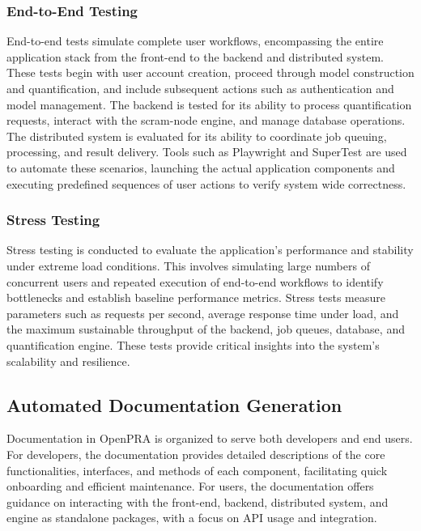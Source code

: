 \subsubsection{End-to-End Testing}

End-to-end tests simulate complete user workflows, encompassing the entire application stack from the front-end to the backend and distributed system. These tests begin with user account creation, proceed through model construction and quantification, and include subsequent actions such as authentication and model management. The backend is tested for its ability to process quantification requests, interact with the scram-node engine, and manage database operations. The distributed system is evaluated for its ability to coordinate job queuing, processing, and result delivery. Tools such as Playwright and SuperTest are used to automate these scenarios, launching the actual application components and executing predefined sequences of user actions to verify system wide correctness.

\subsubsection{Stress Testing}

Stress testing is conducted to evaluate the application's performance and stability under extreme load conditions. This involves simulating large numbers of concurrent users and repeated execution of end-to-end workflows to identify bottlenecks and establish baseline performance metrics. Stress tests measure parameters such as requests per second, average response time under load, and the maximum sustainable throughput of the backend, job queues, database, and quantification engine. These tests provide critical insights into the system's scalability and resilience.

\subsection{Automated Documentation Generation}

Documentation in OpenPRA is organized to serve both developers and end users. For developers, the documentation provides detailed descriptions of the core functionalities, interfaces, and methods of each component, facilitating quick onboarding and efficient maintenance. For users, the documentation offers guidance on interacting with the front-end, backend, distributed system, and engine as standalone packages, with a focus on API usage and integration.

